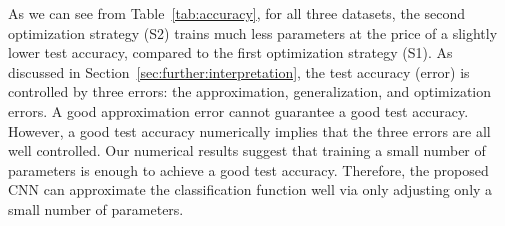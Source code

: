 \documentclass[nohyperref]{article}
\theoremstyle{plain}
\theoremstyle{definition}
\theoremstyle{remark}
\begin{document}
\begin{table}[htp!]    
	\caption{Test accuracy comparison.} 
	\label{tab:accuracy}
	\vskip 0.15in
	\centering  
\end{table} 

As we can see from Table~\ref{tab:accuracy},
for all three datasets, the second optimization strategy (S2) trains much less parameters at the price of a slightly lower test accuracy, compared to the first optimization strategy (S1). 
As discussed in Section~\ref{sec:further:interpretation}, the test  accuracy (error) is controlled by three errors: the approximation, generalization, and optimization errors.
A good approximation error cannot guarantee a good test accuracy.
However, a good test accuracy numerically implies that the three errors are all well controlled. 
Our numerical results suggest that training a small number of parameters is enough to achieve a good test accuracy. 
Therefore, the proposed CNN can approximate the classification function well via only adjusting only a small number of parameters.




\end{document}
